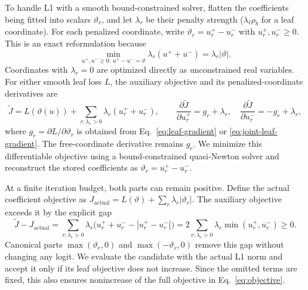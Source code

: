 \documentclass[11pt,a4paper]{article}
\begin{document}
To handle L1 with a smooth bound-constrained solver, flatten the coefficients
being fitted into scalars $\vartheta_r$, and let $\lambda_r$ be their penalty
strength ($\lambda_\ell\rho_b$ for a leaf coordinate). For each penalized
coordinate, write $\vartheta_r=u_r^+-u_r^-$ with $u_r^+,u_r^-\geq0$.
This is an exact reformulation because
\begin{equation}
 \min_{u^+,u^-\geq0:\ u^+-u^-=\vartheta}
 \lambda_r(u^++u^-)=\lambda_r|\vartheta|.
 \label{eq:l1-parts}
\end{equation}
Coordinates with $\lambda_r=0$ are optimized directly as unconstrained real
variables. For either smooth leaf loss $L$, the auxiliary objective and its
penalized-coordinate derivatives are
\begin{equation}
 \widetilde J=L(\vartheta(u))+
   \sum_{r:\lambda_r>0}\lambda_r(u_r^++u_r^-),\qquad
 \frac{\partial\widetilde J}{\partial u_r^+}=g_r+\lambda_r,\quad
 \frac{\partial\widetilde J}{\partial u_r^-}=-g_r+\lambda_r,
 \label{eq:l1-parts-gradient}
\end{equation}
where $g_r=\partial L/\partial\vartheta_r$ is obtained from
Eq.~\eqref{eq:leaf-gradient} or \eqref{eq:joint-leaf-gradient}. The free-coordinate
derivative remains $g_r$. We minimize this differentiable objective using a
bound-constrained quasi-Newton solver and reconstruct the stored coefficients
as $\vartheta_r=u_r^+-u_r^-$.

At a finite iteration budget, both parts can remain positive. Define the
actual coefficient objective as
$J_{\mathrm{actual}}=L(\vartheta)+\sum_r\lambda_r|\vartheta_r|$.
The auxiliary objective exceeds it by the explicit gap
\begin{equation}
 \widetilde J-J_{\mathrm{actual}}
 =\sum_{r:\lambda_r>0}\lambda_r
  \big(u_r^++u_r^- - |u_r^+-u_r^-|\big)
 =2\sum_{r:\lambda_r>0}\lambda_r\min(u_r^+,u_r^-)\geq0.
 \label{eq:l1-gap}
\end{equation}
Canonical parts $\max(\vartheta_r,0)$ and $\max(-\vartheta_r,0)$ remove this
gap without changing any logit. We evaluate the candidate with the actual
L1 norm and accept it only if its leaf objective does not increase. Since
the omitted terms are fixed, this also ensures nonincrease of the full
objective in Eq.~\eqref{eq:objective}.
\end{document}
